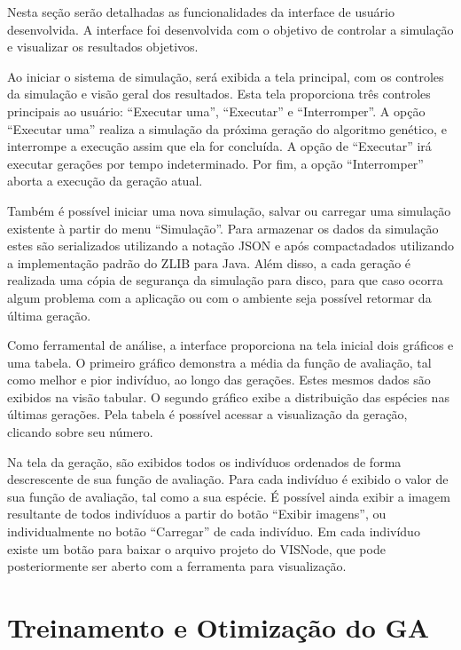 \documentclass[12pt,oneside,a4paper,english,french,spanish,brazil,]{abntex2}
\begin{document}
Nesta seção serão detalhadas as funcionalidades da interface de usuário desenvolvida. A interface foi desenvolvida com o objetivo de controlar a simulação e visualizar os resultados objetivos. 

Ao iniciar o sistema de simulação, será exibida a tela principal, com os controles da simulação e visão geral dos resultados. Esta tela proporciona três controles principais ao usuário: ``Executar uma'', ``Executar'' e ``Interromper''. A opção ``Executar uma'' realiza a simulação da próxima geração do algoritmo genético, e interrompe a execução assim que ela for concluída. A opção de ``Executar'' irá executar gerações por tempo indeterminado. Por fim, a opção ``Interromper'' aborta a execução da geração atual.

Também é possível iniciar uma nova simulação, salvar ou carregar uma simulação existente à partir do menu ``Simulação''. Para armazenar os dados da simulação estes são serializados utilizando a notação JSON \cite{bray:2017} e após compactadados utilizando a implementação padrão do ZLIB \cite{deutsch:1996} para Java. Além disso, a cada geração é realizada uma cópia de segurança da simulação para disco, para que caso ocorra algum problema com a aplicação ou com o ambiente seja possível retormar da última geração.

Como ferramental de análise, a interface proporciona na tela inicial dois gráficos e uma tabela. O primeiro gráfico demonstra a média da função de avaliação, tal como melhor e pior indivíduo, ao longo das gerações. Estes mesmos dados são exibidos na visão tabular. O segundo gráfico exibe a distribuição das espécies nas últimas gerações. Pela tabela é possível acessar a visualização da geração, clicando sobre seu número.

Na tela da geração, são exibidos todos os indivíduos ordenados de forma descrescente de sua função de avaliação. Para cada indivíduo é exibido o valor de sua função de avaliação, tal como a sua espécie. É possível ainda exibir a imagem resultante de todos indivíduos a partir do botão ``Exibir imagens'', ou individualmente no botão ``Carregar'' de cada indivíduo. Em cada indivíduo existe um botão para baixar o arquivo projeto do VISNode, que pode posteriormente ser aberto com a ferramenta para visualização.

\section{Treinamento e Otimização do GA}
\end{document}
